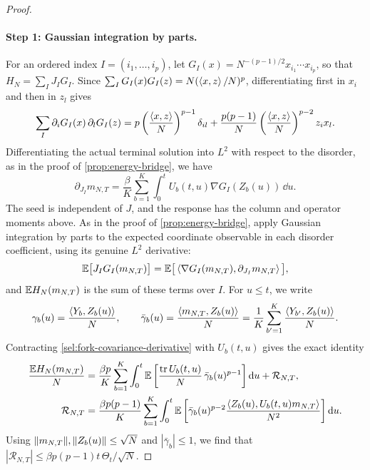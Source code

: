 \begin{proof}
\paragraph{Step 1: Gaussian integration by parts.}
For an ordered index $I=(i_1,\dots,i_p)$, let
$G_I(x)=N^{-(p-1)/2}x_{i_1}\cdots x_{i_p}$, so that
$H_N=\sum_IJ_IG_I$. Since $\sum_IG_I(x)G_I(z)=N(\left\langle x,z\right\rangle/N)^p$,
differentiating first in $x_i$ and then in $z_l$ gives
\begin{equation}\label{sel:fork-covariance-derivative}
 \sum_I\partial_iG_I(x)\,\partial_lG_I(z)
 =p\left(\frac{\left\langle x,z\right\rangle}N\right)^{p-1}\delta_{il}
 +\frac{p(p-1)}N\left(\frac{\left\langle x,z\right\rangle}N\right)^{p-2}z_ix_l.
\end{equation}
Differentiating the actual terminal solution into $L^2$ with respect to the disorder, as in the proof of
\cref{prop:energy-bridge}, we have
\[
 \partial_{J_I}m_{N,T}
 =\frac\beta K\sum_{b=1}^K\int_0^tU_b(t,u)\nabla G_I(Z_b(u))\,\dd u.
\]
The seed is independent of $J$, and the response has the column and operator moments above. As in the proof of \cref{prop:energy-bridge}, apply Gaussian integration by parts to the expected coordinate observable in each disorder coefficient, using its genuine $L^2$ derivative:
\[
 \mathbb E\big[J_IG_I(m_{N,T})\big]=\mathbb E\big[\left\langle\nabla G_I(m_{N,T}),\partial_{J_I}m_{N,T}\right\rangle\big],
\]
and $\mathbb E H_N(m_{N,T})$ is the sum of these terms over $I$. For $u\le t$, we
write
\[
 \gamma_b(u)=\frac{\left\langle Y_b,Z_b(u)\right\rangle}N,\qquad
 \bar\gamma_b(u)=\frac{\left\langle m_{N,T},Z_b(u)\right\rangle}N
 =\frac1K\sum_{b'=1}^K\frac{\left\langle Y_{b'},Z_b(u)\right\rangle}N.
\]
Contracting \eqref{sel:fork-covariance-derivative} with $U_b(t,u)$ gives the
exact identity
\begin{align}
 \frac{\mathbb E H_N(m_{N,T})}N
 ={}&\frac{\beta p}K\sum_{b=1}^K\int_0^t
 \mathbb E\left[\frac{\operatorname{tr} U_b(t,u)}N\,\bar\gamma_b(u)^{p-1}\right]\mathop{}\!\mathrm d u
 +\mathcal R_{N,T},\label{sel:fork-exact-ibp}\\
 \mathcal R_{N,T}={}&\frac{\beta p(p-1)}K\sum_{b=1}^K\int_0^t
 \mathbb E\left[\bar\gamma_b(u)^{p-2}
 \frac{\left\langle Z_b(u),U_b(t,u)m_{N,T}\right\rangle}{N^2}\right]\mathop{}\!\mathrm d u.\notag
\end{align}
Using $\lVert m_{N,T}\rVert,\lVert Z_b(u)\rVert\le\sqrt N$ and $|\bar\gamma_b|\le1$, we
find that $|\mathcal R_{N,T}|\le\beta p(p-1)t\,\Theta_t/\sqrt N$.


\end{proof}
